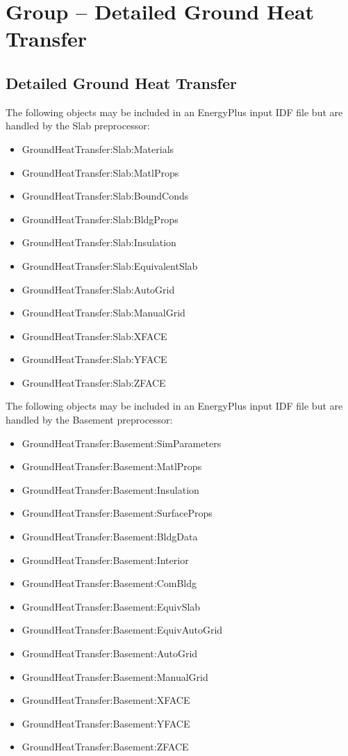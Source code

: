 \section{Group -- Detailed Ground Heat Transfer}\label{group-detailed-ground-heat-transfer}

\subsection{Detailed Ground Heat Transfer}\label{detailed-ground-heat-transfer}

The following objects may be included in an EnergyPlus input IDF file but are handled by the Slab preprocessor:

\begin{itemize}
\item
  GroundHeatTransfer:Slab:Materials
\item
  GroundHeatTransfer:Slab:MatlProps
\item
  GroundHeatTransfer:Slab:BoundConds
\item
  GroundHeatTransfer:Slab:BldgProps
\item
  GroundHeatTransfer:Slab:Insulation
\item
  GroundHeatTransfer:Slab:EquivalentSlab
\item
  GroundHeatTransfer:Slab:AutoGrid
\item
  GroundHeatTransfer:Slab:ManualGrid
\item
  GroundHeatTransfer:Slab:XFACE
\item
  GroundHeatTransfer:Slab:YFACE
\item
  GroundHeatTransfer:Slab:ZFACE
\end{itemize}

The following objects may be included in an EnergyPlus input IDF file but are handled by the Basement preprocessor:

\begin{itemize}
\item
  GroundHeatTransfer:Basement:SimParameters
\item
  GroundHeatTransfer:Basement:MatlProps
\item
  GroundHeatTransfer:Basement:Insulation
\item
  GroundHeatTransfer:Basement:SurfaceProps
\item
  GroundHeatTransfer:Basement:BldgData
\item
  GroundHeatTransfer:Basement:Interior
\item
  GroundHeatTransfer:Basement:ComBldg
\item
  GroundHeatTransfer:Basement:EquivSlab
\item
  GroundHeatTransfer:Basement:EquivAutoGrid
\item
  GroundHeatTransfer:Basement:AutoGrid
\item
  GroundHeatTransfer:Basement:ManualGrid
\item
  GroundHeatTransfer:Basement:XFACE
\item
  GroundHeatTransfer:Basement:YFACE
\item
  GroundHeatTransfer:Basement:ZFACE
\end{itemize}

